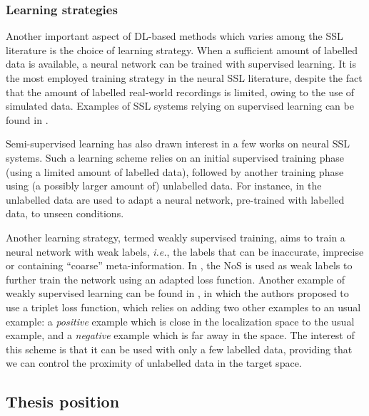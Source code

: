 \subsubsection{Learning strategies}

Another important aspect of DL-based methods which varies among the SSL literature is the choice of learning strategy. When a sufficient amount of labelled data is available, a neural network can be trained with supervised learning. It is the most employed training strategy in the neural SSL literature, despite the fact that the amount of labelled real-world recordings is limited, owing to the use of simulated data. Examples of SSL systems relying on supervised learning can be found in \cite{perotin_crnn-based_2018,youssef_learning-based_2013,hirvonen_classication_2015,chazan_multi-microphone_2019,chakrabarty_multi-speaker_2019}.

Semi-supervised learning has also drawn interest in a few works on neural SSL systems. Such a learning scheme relies on an initial supervised training phase (using a limited amount of labelled data), followed by another training phase using (a possibly larger amount of) unlabelled data. For instance, in \cite{takeda_unsupervised_2018,moing_data-efficient_2021} the unlabelled data are used to adapt a neural network, pre-trained with labelled data, to unseen conditions.

Another learning strategy, termed weakly supervised training, aims to train a neural network with weak labels, \emph{i.e.}, the labels that can be inaccurate, imprecise or containing ``coarse'' meta-information. In \cite{he_adaptation_2019}, the NoS is used as weak labels to further train the network using an adapted loss function. Another example of weakly supervised learning can be found in \cite{opochinsky_deep_2019}, in which the authors proposed to use a triplet loss function, which relies on adding two other examples to an usual example: a \textit{positive} example which is close in the localization space to the usual example, and a \textit{negative} example which is far away in the space. The interest of this scheme is that it can be used with only a few labelled data, providing that we can control the proximity of unlabelled data in the target space.

\subsection{Thesis position}

